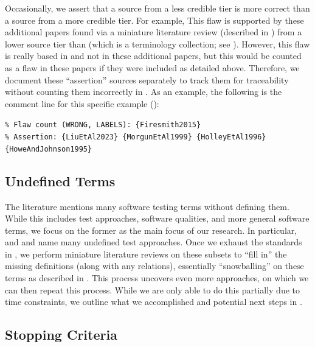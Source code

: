     \label{less-cred-assert}
    Occasionally, we assert that a source from a less credible tier is more
    correct than a source from a more credible tier.
    For example, \tolTestFlaw*{} This flaw is supported by these additional
    papers found via a miniature literature review (described in
    ) from a lower source tier than \citet{Firesmith2015}
    (which is a terminology collection; see ). However,
    this flaw is really based in \citet{Firesmith2015} and not in these
    additional papers, but this would be counted as a flaw in these papers if
    they were included as detailed above. Therefore, we document these
    ``assertion'' sources separately to track them for traceability without
    counting them incorrectly in . As an example, the
    following is the comment line\utd{} for this specific example
    ():
    \begin{displayquote}
        \texttt{\% Flaw count (WRONG, LABELS): \{Firesmith2015\}\\
            \% Assertion: \{LiuEtAl2023\} \{MorgunEtAl1999\} \{HolleyEtAl1996\}
            \displayNL \{HoweAndJohnson1995\}}
    \end{displayquote}
\fi

\subsection{Undefined Terms}\label{undef-terms}

The literature mentions many software testing terms without defining them.
While this includes test approaches, software qualities, and more general
software terms, we focus on the former as the main focus of our research.
In particular, \ifnotpaper \citet{IEEE2022} and \citet{Firesmith2015} \else
    \cite{Firesmith2015} and \cite{IEEE2022} \fi name many undefined test
approaches. Once we exhaust the standards in , we
perform miniature literature reviews on these subsets to ``fill in'' the
missing definitions (along with any relations), essentially ``snowballing''
on these terms as described in . This process uncovers
even more approaches, on which we can then repeat this process. \ifnotpaper
    While we are only able to do this partially due to time constraints, we
    outline what we accomplished and potential next steps in
    . \fi

\subsection{Stopping Criteria}\label{stop-crit}

